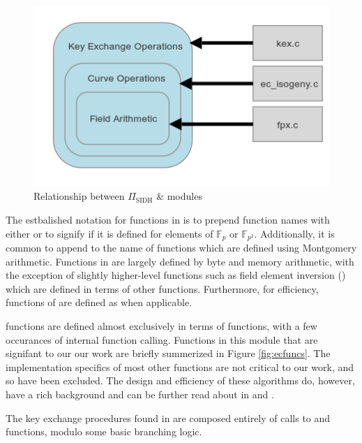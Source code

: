 \begin{figure}[!htb]
\centering
\includegraphics[scale=0.7]{halfmapwcurve.png} %
\caption{Relationship between $\Pi_{\text{SIDH}}$ \& \sidh modules}
\label{fig:halfmap} %
\end{figure}

The estbalished notation for functions in  is to prepend function names with either  or  to signify if it is defined for elements of $\mathbb{F}_{p}$ or $\mathbb{F}_{p^2}$. Additionally, it is common to append  to the name of functions which are defined using Montgomery arithmetic. Functions in  are largely defined by byte and memory arithmetic, with the exception of slightly higher-level functions such as field element inversion () which are defined in terms of other  functions. Furthermore, for efficiency, functions of  are defined as  when applicable.

 functions are defined almost exclusively in terms of  functions, with a few occurances of internal function calling. Functions in this module that are signifant to our our work are briefly summerized in Figure \ref{fig:ecfuncs}. The implementation specifics of most other  functions are not critical to our work, and so have been excluded. The design and efficiency of these algorithms do, however, have a rich background and can be further read about in \cite{djp} and \cite{effalg}.

The key exchange procedures found in  are composed entirely of calls to  and  functions, modulo some basic branching logic.

